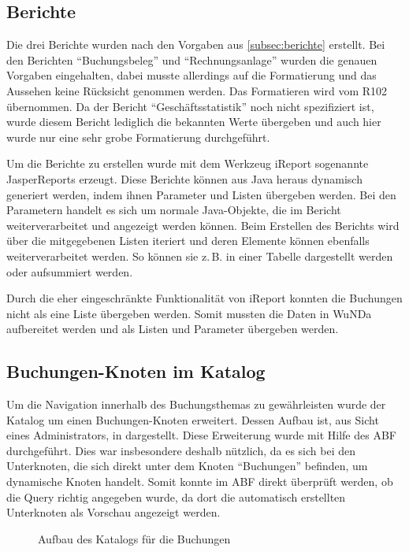 \subsection{Berichte}
Die drei Berichte wurden nach den Vorgaben aus \autoref{subsec:berichte} erstellt.
Bei den Berichten \enquote{Buchungsbeleg} und \enquote{Rechnungsanlage} wurden die genauen Vorgaben eingehalten, dabei musste allerdings auf die Formatierung und das Aussehen keine Rücksicht genommen werden.
Das Formatieren wird vom R102 übernommen.
Da der Bericht \enquote{Geschäftsstatistik} noch nicht spezifiziert ist, wurde diesem Bericht lediglich die bekannten Werte übergeben und auch hier wurde nur eine sehr grobe Formatierung durchgeführt.

Um die Berichte zu erstellen wurde mit dem Werkzeug iReport sogenannte JasperReports erzeugt.
Diese Berichte können aus Java heraus dynamisch generiert werden, indem ihnen Parameter und Listen übergeben werden.
Bei den Parametern handelt es sich um normale Java-Objekte, die im Bericht weiterverarbeitet und angezeigt werden können.
Beim Erstellen des Berichts wird über die mitgegebenen Listen iteriert und deren Elemente können ebenfalls weiterverarbeitet werden.
So können sie z.\,B. in einer Tabelle dargestellt werden oder aufsummiert werden.

Durch die eher eingeschränkte Funktionalität von iReport konnten die Buchungen nicht als eine Liste übergeben werden.
Somit mussten die Daten in \ac{WuNDa} aufbereitet werden und als Listen und Parameter übergeben werden.

\subsection{Buchungen-Knoten im Katalog}
Um die Navigation innerhalb des Buchungsthemas zu gewährleisten wurde der Katalog um einen Buchungen-Knoten erweitert.
Dessen Aufbau ist, aus Sicht eines Administrators, in  dargestellt.
Diese Erweiterung wurde mit Hilfe des \ac{ABF} durchgeführt.
Dies war insbesondere deshalb nützlich, da es sich bei den Unterknoten, die sich direkt unter dem Knoten \enquote{Buchungen} befinden, um dynamische Knoten handelt.
Somit konnte im \ac{ABF} direkt überprüft werden, ob die Query richtig angegeben wurde, da dort die automatisch erstellten Unterknoten als Vorschau angezeigt werden.
\begin{figure}[htb]
	\centering
	\caption{Aufbau des Katalogs für die Buchungen}
	\label{fig:katalog}
\end{figure}

